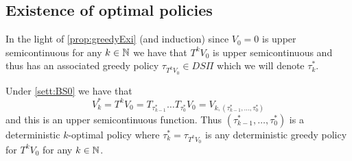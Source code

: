 \subsection{Existence of optimal policies}

In the light of \cref{prop:greedyExi} (and induction)
since $V_0 = 0$ is upper semicontinuous for any $k \in \mathbb{N}$ we have that
$T^k V_0$ is upper semicontinuous and thus has an associated greedy
policy $\tau_{T^k V_0} \in DS\Pi$ which we will denote $\tau^*_k$.

\begin{prop}
  Under \cref{sett:BS0} we have that
  \[ V^*_k = T^k V_0 = T_{\tau^*_{k-1}} \dots T_{\tau^*_0} V_0
  = V_{k, (\tau^*_{k-1}, \dots, \tau^*_0)} \]
  and this is an upper semicontinuous function.
  Thus $(\tau^*_{k-1}, \dots, \tau^*_0)$ is a deterministic
  $k$-optimal policy
  where $\tau_k^* = \tau_{T^k V_0}$ is any deterministic
  greedy policy for $T^k V_0$ for any $k \in \mathbb{N}$.
  \label{prop:kOpt}
\end{prop}
